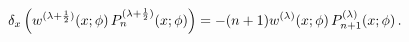 \[\delta_{x}\left(w^{(\lambda+\frac{1}{2})}(x;\phi)\mathop{P^{(\lambda+\frac{1}{%
2})}_{n}\/}\nolimits\!\left(x;\phi\right)\right)=-(n+1)w^{(\lambda)}(x;\phi)%
\mathop{P^{(\lambda)}_{n+1}\/}\nolimits\!\left(x;\phi\right).\]